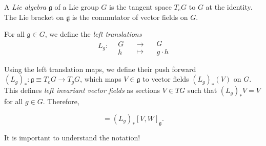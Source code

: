 \begin{definition}[]
  A \emph{Lie algebra} $\mathfrak{g}$ of a Lie group $G$ is the tangent space $T_e G$ to $G$ at the identity.
  The Lie bracket on $\mathfrak{g}$ is the commutator of vector fields on $G$.
\end{definition}

\begin{definition}
  For all $\mathfrak{g} \in G$, we define the \emph{left translations} 
  \begin{equation}
    \begin{gathered}
      L_g \colon \\
      \qquad
    \end{gathered}
    \begin{gathered}
      G \\
      h
    \end{gathered}
    \quad
    \begin{gathered}
      \to \\
      \mapsto
    \end{gathered}
    \quad
    \begin{gathered}
      G \\
      g \cdot h
    \end{gathered}
  \end{equation}
\end{definition}
\begin{definition}
  Using the left translation maps, we define their push forward $(L_g)_* \colon \mathfrak{g} \equiv T_e G \to T_g G$, which maps $V \in \mathfrak{g}$ to vector fields $(L_g)_* (V)$ on $G$.
  This defines \emph{left invariant vector fields} as sections $V \in TG$ such that $(L_g)_* V = V$ for all $g \in G$. Therefore, 
\end{definition}
\begin{equation}
  [(L_g)_* V, (L_g)_* W] = (L_g)_* [V, W]_\mathfrak{g}.
\end{equation}
\begin{remark}
  It is important to understand the notation!
\end{remark}

